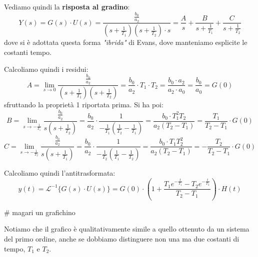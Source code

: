 \documentclass[a4paper,11pt]{article}
\begin{document}
\par\medskip

Vediamo quindi la \textbf{risposta al gradino}:
$$
Y(s) = G(s) \cdot U(s) = \frac{\frac{b_0}{a_2}}{(s + \frac{1}{T_1})(s + \frac{1}{T_2}) \cdot s} = \frac{A}{s} + \frac{B}{s + \frac{1}{T_1}} + \frac{C}{s + \frac{1}{T_2}}
$$
dove si è adottata questa forma \textit{"ibrida"} di Evans, dove manteniamo esplicite le costanti tempo.

Calcoliamo quindi i residui:
$$
A = \lim_{s \rightarrow 0} \frac{\frac{b_0}{a_2}}{(s + \frac{1}{T_1})(s + \frac{1}{T_2})} = \frac{b_0}{a_2} \cdot T_1 \cdot T_2 = \frac{b_0 \cdot a_2}{a_2 \cdot a_0} = \frac{b_0}{a_0} = G(0)
$$
sfruttando la proprietà 1 riportata prima.
Si ha poi:
$$
B = \lim_{s \rightarrow - \frac{1}{T_1}} \frac{\frac{b_0}{a_2}}{s (s + \frac{1}{T_2})} 
= \frac{b_0}{a_2} \cdot \frac{1}{-\frac{1}{T_1} (\frac{1}{T_2} - \frac{1}{T_1})} 
= \frac{b_0 \cdot T_1^2 T_2}{a_2 (T_2 - T_1)} 
= \frac{T_1}{T_2 - T_1} \cdot G(0)
$$
$$
C = \lim_{s \rightarrow - \frac{1}{T_2}} \frac{\frac{b_0}{a_2}}{s (s + \frac{1}{T_1})} 
= \frac{b_0}{a_2} \cdot \frac{1}{-\frac{1}{T_2} (\frac{1}{T_1} - \frac{1}{T_2})} 
= \frac{b_0 \cdot T_1 T_2^2}{a_2 (T_2 - T_1)} 
= -\frac{T_2}{T_2 - T_1} \cdot G(0)
$$

Calcoliamo quindi l'antitrasformata:
$$
y(t) = \mathcal{L}^{-1} \{ G(s) \cdot U(s) \} = G(0) \cdot \left( 1 + \frac{T_1 e^{-\frac{t}{T_1}} - T_2 e^{-\frac{t}{T_2}}}{T_2 - T_1} \right) \cdot H(t)
$$

# magari un grafichino

Notiamo che il grafico è qualitativamente simile a quello ottenuto da un sistema del primo ordine, anche se dobbiamo distinguere non una ma due costanti di tempo, $T_1$ e $T_2$.
\end{document}
